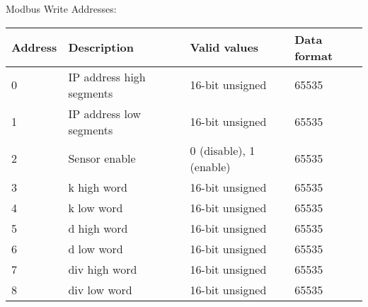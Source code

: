 Modbus Write Addresses:
\begin{tabular}{|l|l|l|l|}
\hline \textbf{Address} & \textbf{Description} & \textbf{Valid values} & \textbf{Data format} \\ 
\hline
\hline 0 & IP address high segments & 16-bit unsigned & 65535 \\ 
\hline 1 & IP address low segments & 16-bit unsigned & 65535 \\ 
\hline 2 & Sensor enable & 0 (disable), 1 (enable) & 65535 \\ 
\hline 3 & k high word & 16-bit unsigned & 65535 \\ 
\hline 4 & k low word & 16-bit unsigned & 65535 \\ 
\hline 5 & d high word & 16-bit unsigned & 65535 \\ 
\hline 6 & d low word & 16-bit unsigned & 65535 \\ 
\hline 7 & div high word & 16-bit unsigned & 65535 \\ 
\hline 8 & div low word & 16-bit unsigned & 65535 \\ 
\hline 
\end{tabular} 
